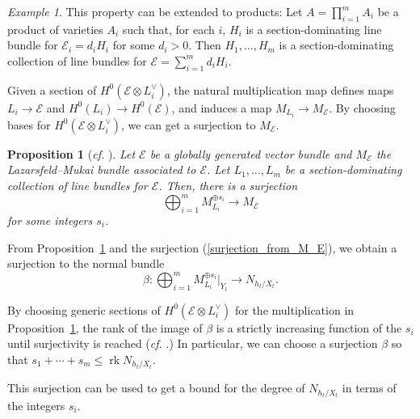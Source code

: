 \documentclass[11pt]{amsart}
\numberwithin{equation}{section}
\newtheorem{proposition}[theorem]{Proposition}
\theoremstyle{definition}
\theoremstyle{remark}
\newtheorem{example}[theorem]{Example}
\DeclareMathOperator{\rk}{rk}
\newcommand{\lra}{\longrightarrow}
\begin{document}
\begin{example}\label{section-dom-products}
This property can be extended to products: Let $A = \prod_{i=1}^m A_i$ be a product of varieties $A_i$ such that, for each $i$, $H_i$ is a section-dominating line bundle for $\mathcal{E}_i=d_iH_i$ for some $d_i>0$. Then $H_1, \hdots , H_m$ is a section-dominating collection of line bundles for $\mathcal{E} = \sum_{i=1}^m d_iH_i$. 
\end{example}

Given a section of $H^0(\mathcal{E}\otimes L_i^\vee)$, the natural multiplication map defines maps $L_i\to \mathcal{E}$ and $H^0(L_i)\to H^0(\mathcal{E})$, and induces a map $M_{L_i}\to M_{\mathcal{E}}$. By choosing bases for $H^0(\mathcal{E}\otimes L_i^\vee)$, we can get a surjection to $M_{\mathcal{E}}$.

\begin{proposition}[\textit{cf.} {\cite[Proposition 2.7]{CR19}}]\label{surjectionofmukai}
Let $\mathcal{E}$ be a globally generated vector bundle and $M_{\mathcal{E}}$ the Lazarsfeld--Mukai bundle associated to $\mathcal{E}$. Let $L_1, \hdots , L_m$ be a section-dominating collection of line bundles for $\mathcal{E}$. Then, there is a surjection
\[ \bigoplus _{i=1}^{m}M_{L_i}^{\oplus s_i}\lra M_{\mathcal{E}} \]
for some integers $s_i$.
\end{proposition}

From Proposition~\ref{surjectionofmukai} and the surjection (\ref{surjection_from_M_E}), we obtain a surjection to the normal bundle
\begin{equation}\label{surjection_beta}
\beta\colon \bigoplus _{i=1}^{m}M_{L_i}^{\oplus s_i}|_{Y_t}\lra N_{h_t/X_t}.
\end{equation}

By choosing generic sections of $H^0(\mathcal{E}\otimes L_i^\vee)$ for the multiplication in Proposition~\ref{surjectionofmukai}, the rank of the image of $\beta$ is a strictly increasing function of the $s_i$ until surjectivity is reached (\textit{cf.} \cite[Section 2.2]{Cl03}.) In particular, we can choose a surjection $\beta$ so that $s_1 + \cdots + s_m\le \rk N_{h_t/X_t}$.

This surjection can be used to get a bound for the degree of $N_{h_t/X_t}$ in terms of the integers $s_i$.
\end{document}
